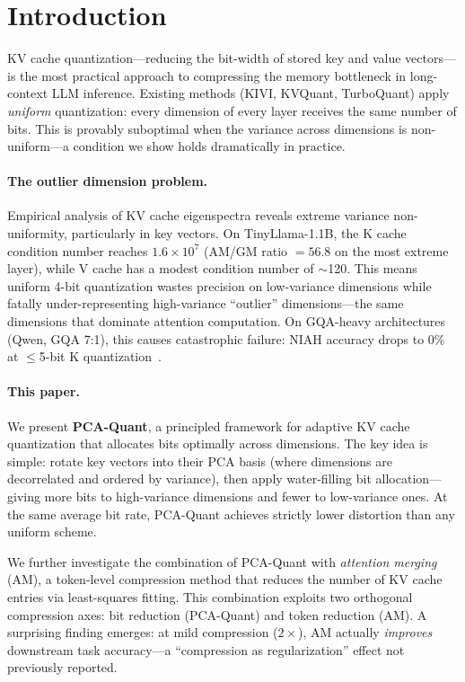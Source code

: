 \section{Introduction}
\label{sec:intro}

KV cache quantization---reducing the bit-width of stored key and value vectors---is the most practical approach to compressing the memory bottleneck in long-context LLM inference. Existing methods (KIVI, KVQuant, TurboQuant) apply \emph{uniform} quantization: every dimension of every layer receives the same number of bits. This is provably suboptimal when the variance across dimensions is non-uniform---a condition we show holds dramatically in practice.

\paragraph{The outlier dimension problem.}
Empirical analysis of KV cache eigenspectra reveals extreme variance non-uniformity, particularly in key vectors. On TinyLlama-1.1B, the K cache condition number reaches $1.6 \times 10^7$ (AM/GM ratio $= 56.8$ on the most extreme layer), while V cache has a modest condition number of $\sim$120. This means uniform 4-bit quantization wastes precision on low-variance dimensions while fatally under-representing high-variance ``outlier'' dimensions---the same dimensions that dominate attention computation. On GQA-heavy architectures (Qwen, GQA 7:1), this causes catastrophic failure: NIAH accuracy drops to 0\% at $\leq$5-bit K quantization~\citep{paper1}.

\paragraph{This paper.}
We present \textbf{PCA-Quant}, a principled framework for adaptive KV cache quantization that allocates bits optimally across dimensions. The key idea is simple: rotate key vectors into their PCA basis (where dimensions are decorrelated and ordered by variance), then apply water-filling bit allocation---giving more bits to high-variance dimensions and fewer to low-variance ones. At the same average bit rate, PCA-Quant achieves strictly lower distortion than any uniform scheme.

We further investigate the combination of PCA-Quant with \emph{attention merging} (AM), a token-level compression method that reduces the number of KV cache entries via least-squares fitting. This combination exploits two orthogonal compression axes: bit reduction (PCA-Quant) and token reduction (AM). A surprising finding emerges: at mild compression ($2\times$), AM actually \emph{improves} downstream task accuracy---a ``compression as regularization'' effect not previously reported.

